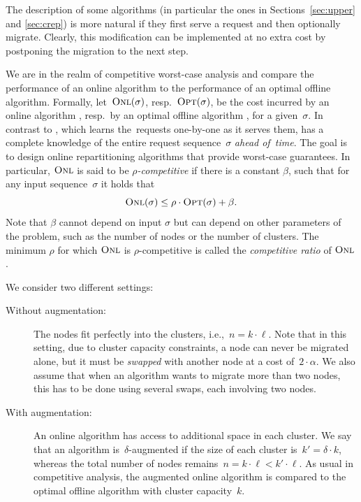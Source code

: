 The description of some algorithms (in particular the ones in Sections~\ref{sec:upper}
and \ref{sec:crep}) is more natural if they first serve a request and then
optionally migrate. Clearly, this modification can be implemented at no extra cost by
postponing the migration to the next step.

We are in the realm of competitive worst-case analysis and compare the
performance of an online algorithm to the performance of an optimal offline
algorithm. Formally, let~$\textsc{Onl}(\sigma)$, resp.~$\textsc{Opt}(\sigma)$, be the cost
incurred by an online algorithm \ONL, resp.~by an optimal offline
algorithm \OPT, for a given~$\sigma$. In contrast to \ONL, which learns the~requests one-by-one as
it serves them, \OPT has a complete knowledge of the entire request
sequence~$\sigma$ \emph{ahead of~time}. The goal is to design online repartitioning
algorithms that provide worst-case guarantees. In particular, $\textsc{Onl}$ is said
to be \emph{$\rho$-competitive} if there is a constant $\beta$, such that for any
input sequence~$\sigma$ it holds that
\[
	\textsc{Onl}(\sigma) \leq \rho \cdot \textsc{Opt}(\sigma) + \beta.
\]
Note that $\beta$ cannot depend on input $\sigma$ but can depend on other
parameters of the problem, such as the number of nodes or the number of clusters.
The minimum $\rho$ for which $\textsc{Onl}$ is $\rho$-competitive is called the 
\emph{competitive ratio} of $\textsc{Onl}$. 

We consider two different settings:

\begin{description}

\item[Without augmentation:] The nodes fit perfectly into the clusters,
i.e.,~$n=k\cdot \ell$. Note that in this setting, due to cluster capacity
constraints, a node can never be migrated alone, but it must be \emph{swapped}
with another node at a cost of~$2 \cdot \alpha$. We also assume that when an
algorithm wants to migrate more than two nodes, this has to be done using
several swaps, each involving two nodes.

\item[With augmentation:] An online algorithm has access to additional space
in each cluster. We say that an algorithm is~$\delta$-augmented if the size of
each cluster is~$k' = \delta \cdot k$, whereas the total number of nodes
remains~$n = k\cdot \ell < k'\cdot \ell$. As usual in competitive analysis,
the augmented online algorithm is compared to the optimal offline algorithm
with cluster capacity~$k$.
\end{description}

